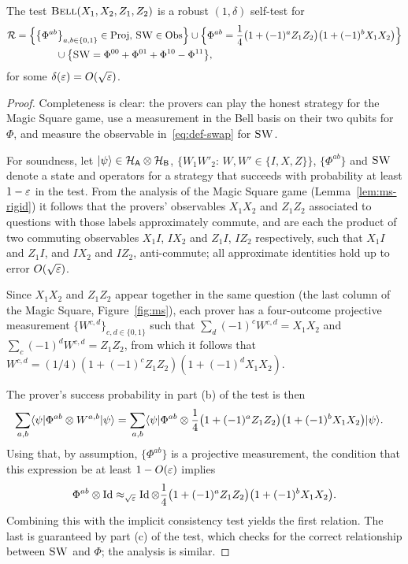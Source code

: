\begin{lemma}\label{lem:bell-rigid-test}
The test $\textsc{Bell}(X_1,X_2,Z_1,Z_2)$ is a robust $(1,\delta)$ self-test for 
\begin{align*}
\mathcal{R}&= \Big\{\big\{\Phi^{ab}\big\}_{a,b\in\{0,1\}}\in\mathrm{Proj},\, \textsc{SW}\in\mathrm{Obs}\Big\}\cup \Big\{\Phi^{ab} = \frac{1}{4}\big(1+(-1)^a Z_1Z_2\big)\big(1+(-1)^bX_1X_2\big) \Big\}\\
&\qquad\qquad \cup \big\{\textsc{SW} = \Phi^{00}+\Phi^{01}+\Phi^{10}-\Phi^{11}\big\},
\end{align*}
 for some $\delta(\varepsilon) = O(\sqrt{\varepsilon})$.
\end{lemma}


\begin{proof}
Completeness is clear: the provers can play the honest strategy for the Magic Square game, use a measurement in the Bell basis on their two qubits for $\Phi$, and measure the  observable in~\eqref{eq:def-swap} for $\textsc{SW}$. 

For soundness, let $|\psi\rangle\in\mathcal{H}_{\textsf{A}}\otimes \mathcal{H}_{\textsf{B}}$, $\{W_1W'_2:\, W,W'\in\{I,X,Z\}\}$, $\{\Phi^{ab}\}$ and $\textsc{SW}$ denote a state and operators for a strategy that succeeds with probability at least $1-\varepsilon$ in the test. From the analysis of the Magic Square game (Lemma~\ref{lem:ms-rigid}) it follows that the provers' observables $X_1X_2$ and $Z_1Z_2$ associated to questions with those  labels approximately commute, and are each the product of two commuting observables $X_1I$, $IX_2$ and $Z_1I$, $IZ_2$ respectively, such that $X_1I$ and $Z_1I$, and $IX_2$ and $IZ_2$, anti-commute; all approximate identities hold up to error $O(\sqrt{\varepsilon})$. 

Since $X_1X_2$ and $Z_1Z_2$ appear together in the same question (the last column of the Magic Square, Figure~\ref{fig:ms}), each prover has a four-outcome projective measurement $\{W^{c,d}\}_{c,d\in\{0,1\}}$ such that $\sum_d (-1)^c W^{c,d} = X_1X_2$ and $\sum_c (-1)^dW^{c,d} = Z_1Z_2$, from which it follows that $W^{c,d} = (1/4)(1+(-1)^c Z_1Z_2)(1+(-1)^d X_1X_2)$. 

The prover's success probability in part (b) of the test is then
\begin{align*}
\sum_{a,b} \langle\psi| \Phi^{ab} \otimes W^{a,b} |\psi\rangle &= \sum_{a,b} \langle\psi| \Phi^{ab} \otimes \frac{1}{4} \big(1+(-1)^a Z_1Z_2\big)\big(1+(-1)^bX_1X_2\big) |\psi\rangle.
\end{align*}
Using that, by assumption, $\{\Phi^{ab}\}$ is a projective measurement, the condition that this expression be at least $1-O(\varepsilon)$ implies 
$$\Phi^{ab} \otimes \mathop{\rm Id}\nolimits \approx_{\sqrt{\varepsilon}}\mathop{\rm Id}\nolimits \otimes \frac{1}{4}\big(1+(-1)^a Z_1Z_2\big)\big(1+(-1)^bX_1X_2\big).$$ 
Combining this with the implicit consistency test yields the first relation. The last is guaranteed by part (c) of the test, which checks for the correct relationship between $\textsc{SW}$ and $\Phi$; the analysis is similar.  
\end{proof}


